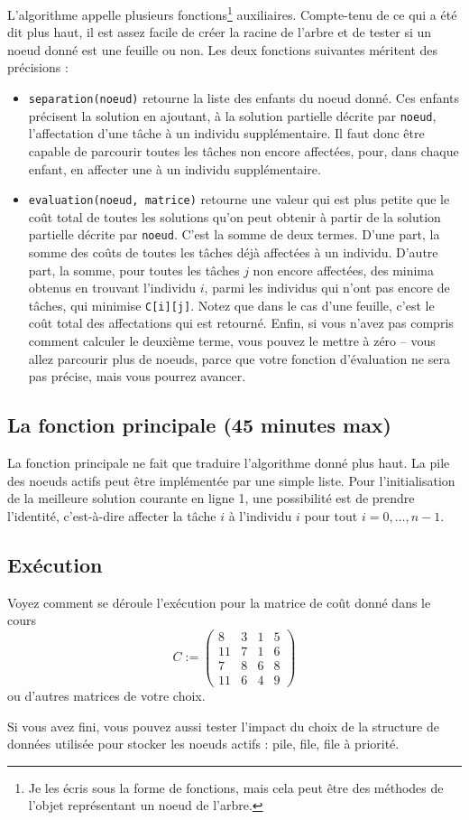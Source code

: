 \documentclass[a4paper,francais]{article}
\theoremstyle{definition}
\begin{document}
L'algorithme appelle plusieurs fonctions\footnote{Je les écris sous la forme de fonctions, mais cela peut être des méthodes de l'objet représentant un noeud de l'arbre.} auxiliaires. Compte-tenu de ce qui a été dit plus haut, il est assez facile de créer la racine de l'arbre et de tester si un noeud donné est une feuille ou non. Les deux fonctions suivantes méritent des précisions :
\begin{itemize}
\item \verb+separation(noeud)+ retourne la liste des enfants du noeud donné. Ces enfants précisent la solution en ajoutant, à la solution partielle décrite par \verb+noeud+, l'affectation d'une tâche à un individu supplémentaire. Il faut donc être capable de parcourir toutes les tâches non encore affectées, pour, dans chaque enfant, en affecter une à un individu supplémentaire. 
\item \verb+evaluation(noeud, matrice)+ retourne une valeur qui est plus petite que le coût total de toutes les solutions qu'on peut obtenir à partir de la solution partielle décrite par \verb+noeud+. C'est la somme de deux termes. D'une part, la somme des coûts de toutes les tâches déjà affectées à un individu. D'autre part, la somme, pour toutes les tâches $j$ non encore affectées, des minima obtenus en trouvant l'individu $i$, parmi les individus qui n'ont pas encore de tâches, qui minimise \verb+C[i][j]+. Notez que dans le cas d'une feuille, c'est le coût total des affectations qui est retourné. Enfin, si vous n'avez pas compris comment calculer le deuxième terme, vous pouvez le mettre à zéro -- vous allez parcourir plus de noeuds, parce que votre fonction d'évaluation ne sera pas précise, mais vous pourrez avancer.    
\end{itemize}

\subsection{La fonction principale (45 minutes max)}

La fonction principale ne fait que traduire l'algorithme donné plus haut.
La pile des noeuds actifs peut être implémentée par une simple liste.
Pour l'initialisation de la meilleure solution courante en ligne 1,
une possibilité est de prendre l'identité,
c'est-à-dire affecter la tâche $i$ à l'individu $i$
pour tout $i=0,\dots,n-1$. 

\subsection{Exécution}

Voyez comment se déroule l'exécution pour la matrice de coût donné dans le cours
    \[ C := \left(
    \begin{array}{cccc}
      8 & 3 & 1 & 5 \\
      11 & 7 & 1 & 6 \\
      7 & 8 & 6 & 8 \\
      11 & 6 & 4 & 9 
    \end{array}
    \right) \]
ou d'autres matrices de votre choix.

Si vous avez fini, vous pouvez aussi tester l'impact du choix de la structure de données utilisée
pour stocker les noeuds actifs : pile, file, file à priorité.   
\end{document}
